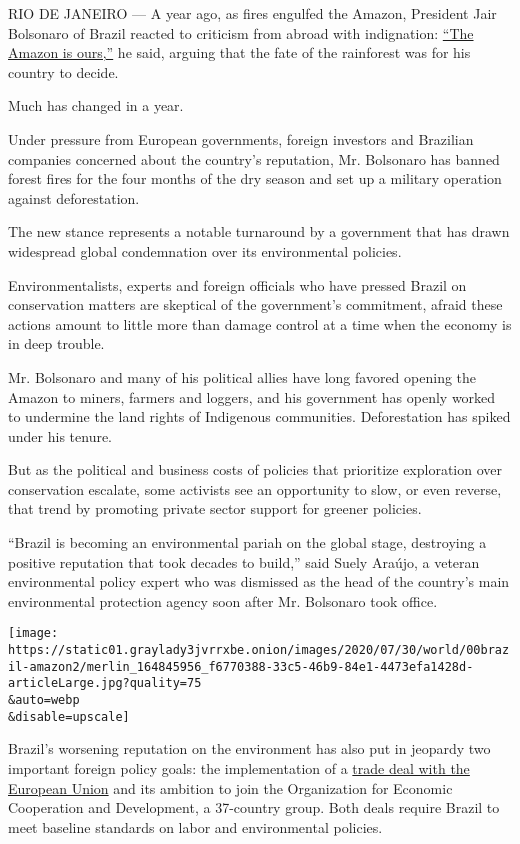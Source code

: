 RIO DE JANEIRO --- A year ago, as fires engulfed the Amazon, President
Jair Bolsonaro of Brazil reacted to criticism from abroad with
indignation:
\href{https://www.nytimes3xbfgragh.onion/2019/07/28/world/americas/brazil-deforestation-amazon-bolsonaro.html}{``The
Amazon is ours,''} he said, arguing that the fate of the rainforest was
for his country to decide.

Much has changed in a year.

Under pressure from European governments, foreign investors and
Brazilian companies concerned about the country's reputation, Mr.
Bolsonaro has banned forest fires for the four months of the dry season
and set up a military operation against deforestation.

The new stance represents a notable turnaround by a government that has
drawn widespread global condemnation over its environmental policies.

Environmentalists, experts and foreign officials who have pressed Brazil
on conservation matters are skeptical of the government's commitment,
afraid these actions amount to little more than damage control at a time
when the economy is in deep trouble.

Mr. Bolsonaro and many of his political allies have long favored opening
the Amazon to miners, farmers and loggers, and his government has openly
worked to undermine the land rights of Indigenous communities.
Deforestation has spiked under his tenure.

But as the political and business costs of policies that prioritize
exploration over conservation escalate, some activists see an
opportunity to slow, or even reverse, that trend by promoting private
sector support for greener policies.

``Brazil is becoming an environmental pariah on the global stage,
destroying a positive reputation that took decades to build,'' said
Suely Araújo, a veteran environmental policy expert who was dismissed as
the head of the country's main environmental protection agency soon
after Mr. Bolsonaro took office.

\texttt{[image: https://static01.graylady3jvrrxbe.onion/images/2020/07/30/world/00brazil-amazon2/merlin\_164845956\_f6770388-33c5-46b9-84e1-4473efa1428d-articleLarge.jpg?quality=75\\\&auto=webp\\\&disable=upscale]}

Brazil's worsening reputation on the environment has also put in
jeopardy two important foreign policy goals: the implementation of a
\href{https://www.dw.com/en/austria-deals-first-blow-to-eu-mercosur-trade-pact/a-50489747}{trade
deal with the European Union} and its ambition to join the Organization
for Economic Cooperation and Development, a 37-country group. Both deals
require Brazil to meet baseline standards on labor and environmental
policies.

